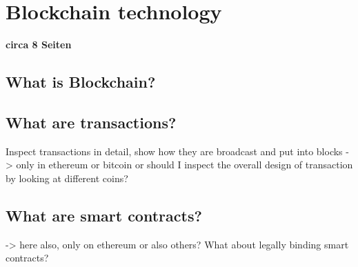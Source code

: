 \chapter{Blockchain technology}
\textbf{circa 8 Seiten}

\section{What is Blockchain?} \label{sec:Blockchain}

\section{What are transactions?} \label{sec:TX}

Inspect transactions in detail, show how they are broadcast and put into blocks
-> only in ethereum or bitcoin or should I inspect the overall design of transaction by looking at different coins?

\section{What are smart contracts?} \label{sec:SmartContracts}

-> here also, only on ethereum or also others? What about legally binding smart contracts?
